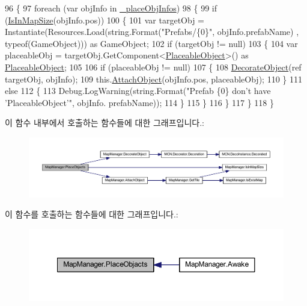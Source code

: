 \begin{DoxyCode}
96     \{
97         \textcolor{keywordflow}{foreach} (var objInfo \textcolor{keywordflow}{in} \hyperlink{class_map_manager_ab581d2c754246f74999a0b744ba2b14f}{\_placeObjInfos})
98         \{
99             \textcolor{keywordflow}{if} (\hyperlink{class_map_manager_a504d7a68ace64557bc3c3254a8b1cddc}{IsInMapSize}(objInfo.pos))
100             \{
101                 var targetObj = Instantiate(Resources.Load(\textcolor{keywordtype}{string}.Format(\textcolor{stringliteral}{"Prefabs/\{0\}"}, objInfo.prefabName)
      , typeof(GameObject))) as GameObject;
102                 if (targetObj != null)
103                 \{
104                     var placeableObj = targetObj.GetComponent<\hyperlink{class_placeable_object}{PlaceableObject}>() as 
      \hyperlink{class_placeable_object}{PlaceableObject};
105 
106                     \textcolor{keywordflow}{if} (placeableObj != null)
107                     \{
108                         \hyperlink{class_map_manager_a31c2b0b9cf8f208a596b65e7f1d88873}{DecorateObject}(ref targetObj, objInfo);
109                         this.\hyperlink{class_map_manager_ab8cbf46e369a9c59ff183a1b6c3b20bb}{AttachObject}(objInfo.pos, placeableObj);
110                     \}
111                     \textcolor{keywordflow}{else}
112                     \{
113                         Debug.LogWarning(\textcolor{keywordtype}{string}.Format(\textcolor{stringliteral}{"Prefab \{0\} don't have 'PlaceableObject'"}, objInfo.
      prefabName));
114                     \}
115                 \}
116             \}
117         \}
118     \}
\end{DoxyCode}


이 함수 내부에서 호출하는 함수들에 대한 그래프입니다.\+:\nopagebreak
\begin{figure}[H]
\begin{center}
\leavevmode
\includegraphics[width=350pt]{class_map_manager_a4213ccbaa1a81d0a47884de50a28de32_cgraph}
\end{center}
\end{figure}




이 함수를 호출하는 함수들에 대한 그래프입니다.\+:\nopagebreak
\begin{figure}[H]
\begin{center}
\leavevmode
\includegraphics[width=350pt]{class_map_manager_a4213ccbaa1a81d0a47884de50a28de32_icgraph}
\end{center}
\end{figure}


